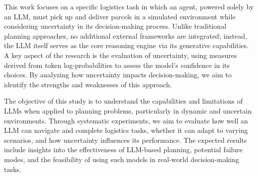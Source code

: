 This work focuses on a specific logistics task in which an agent, powered solely
by an LLM, must pick up and deliver parcels in a simulated environment while
considering uncertainty in its decision-making process. Unlike traditional planning
approaches, no additional external frameworks are integrated; instead, the LLM
itself serves as the core reasoning engine via its generative capabilities. A key
aspect of the research is the evaluation of uncertainty, using measures derived
from token log-probabilities to assess the model's confidence in its choices. By
analyzing how uncertainty impacts decision-making, we aim to identify the
strengths and weaknesses of this approach.

The objective of this study is to understand the capabilities and limitations of
LLMs when applied to planning problems, particularly in dynamic and uncertain environments.
Through systematic experiments, we aim to evaluate how well an LLM can navigate and
complete logistics tasks, whether it can adapt to varying scenarios, and how uncertainty
influences its performance. The expected results include insights into the
effectiveness of LLM-based planning, potential failure modes, and the
feasibility of using such models in real-world decision-making tasks.

